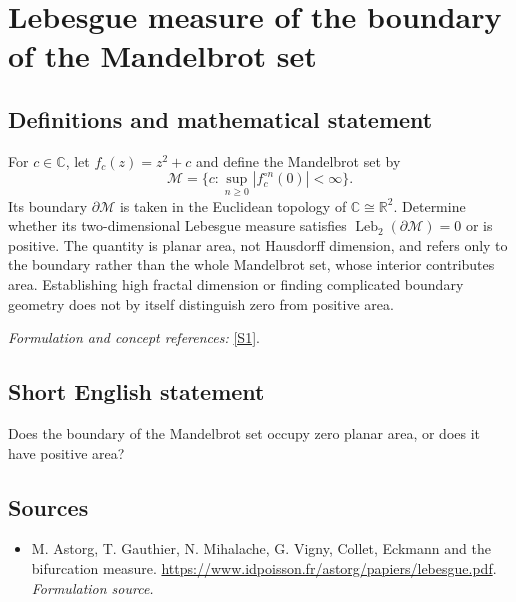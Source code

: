 \documentclass[11pt]{article}
\begin{document}
\section*{\texorpdfstring{Lebesgue measure of the boundary of the Mandelbrot set}{Lebesgue measure of the boundary of the Mandelbrot set}}\label{statement}
\subsection{Definitions and mathematical statement}
For $c\in{\mathbb{C}}$, let $f_c(z)=z^2+c$ and define the Mandelbrot set by
\[
 \mathcal M=\{c:\sup_{n\ge0}|f_c^{\circ n}(0)|<\infty\}.
\]
Its boundary $\partial\mathcal M$ is taken in the Euclidean topology of ${\mathbb{C}}\cong{\mathbb{R}}^2$. Determine whether its two-dimensional Lebesgue measure satisfies $\operatorname{Leb}_2(\partial\mathcal M)=0$ or is positive. The quantity is planar area, not Hausdorff dimension, and refers only to the boundary rather than the whole Mandelbrot set, whose interior contributes area. Establishing high fractal dimension or finding complicated boundary geometry does not by itself distinguish zero from positive area.
\par\smallskip\textit{Formulation and concept references:} \href{https://www.idpoisson.fr/astorg/papiers/lebesgue.pdf}{[S1]}.

\subsection{Short English statement}
Does the boundary of the Mandelbrot set occupy zero planar area, or does it have positive area?
\subsection{Sources}
\begin{itemize}
\item[S1]M. Astorg, T. Gauthier, N. Mihalache, G. Vigny, Collet, Eckmann and the bifurcation measure.
\url{https://www.idpoisson.fr/astorg/papiers/lebesgue.pdf}.
\textit{Formulation source.}
\end{itemize}
\end{document}

